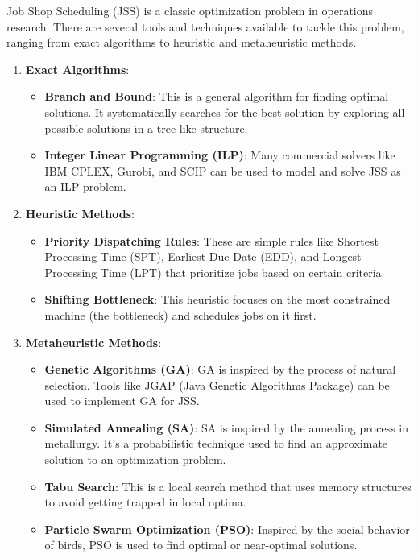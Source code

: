 Job Shop Scheduling (JSS) is a classic optimization problem in operations research. There are several tools and techniques available to tackle this problem, ranging from exact algorithms to heuristic and metaheuristic methods.

\begin{enumerate}
    \item \textbf{Exact Algorithms}:
    \begin{itemize}
        \item \textbf{Branch and Bound}: This is a general algorithm for finding optimal solutions. It systematically searches for the best solution by exploring all possible solutions in a tree-like structure.
        \item \textbf{Integer Linear Programming (ILP)}: Many commercial solvers like IBM CPLEX, Gurobi, and SCIP can be used to model and solve JSS as an ILP problem.
    \end{itemize}

    \item \textbf{Heuristic Methods}:
    \begin{itemize}
        \item \textbf{Priority Dispatching Rules}: These are simple rules like Shortest Processing Time (SPT), Earliest Due Date (EDD), and Longest Processing Time (LPT) that prioritize jobs based on certain criteria.
        \item \textbf{Shifting Bottleneck}: This heuristic focuses on the most constrained machine (the bottleneck) and schedules jobs on it first.
    \end{itemize}

    \item \textbf{Metaheuristic Methods}:
    \begin{itemize}
        \item \textbf{Genetic Algorithms (GA)}: GA is inspired by the process of natural selection. Tools like JGAP (Java Genetic Algorithms Package) can be used to implement GA for JSS.
        \item \textbf{Simulated Annealing (SA)}: SA is inspired by the annealing process in metallurgy. It's a probabilistic technique used to find an approximate solution to an optimization problem.
        \item \textbf{Tabu Search}: This is a local search method that uses memory structures to avoid getting trapped in local optima.
        \item \textbf{Particle Swarm Optimization (PSO)}: Inspired by the social behavior of birds, PSO is used to find optimal or near-optimal solutions.
    \end{itemize}


\end{enumerate}
